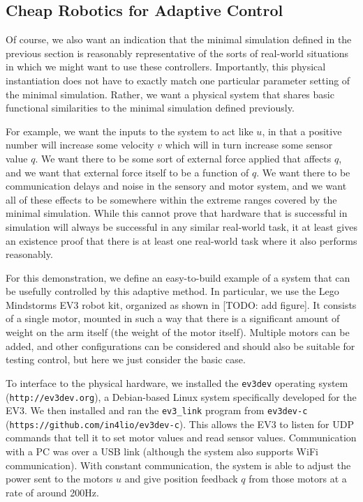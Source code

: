 \documentclass{frontiersSCNS} %
\begin{document}
\subsection{Cheap Robotics for Adaptive Control}

Of course, we also want an indication that the minimal simulation defined
in the previous section is reasonably representative of the sorts of real-world
situations in which we might want to use these controllers.  Importantly, 
this physical instantiation does not have to exactly match one particular
parameter setting of the minimal simulation.  Rather, we want a physical system
that shares basic functional similarities to the minimal simulation defined
previously.

For example, we want the inputs to the system to act like $u$, in that a
positive number will increase some velocity $v$ which will in turn increase some
sensor value $q$.  We want there to be some sort of external force applied that
affects $q$, and we want that external force itself to be a function of $q$.
We want there to be communication delays and noise in the sensory and motor
system, and we want all of these effects to be somewhere within the extreme
ranges covered by the minimal simulation.  While this cannot prove that hardware
that is successful in simulation will always be successful in any similar
real-world task, it at least gives an existence proof that there is at least
one real-world task where it also performs reasonably.

For this demonstration, we define an easy-to-build example of a system that can be usefully controlled
by this adaptive method.  In particular, we use the Lego Mindstorms EV3 robot kit,
organized as shown in [TODO: add figure].  It consists of a single
motor, mounted in such a way that there is a significant amount of weight on
the arm itself (the weight of the motor itself).  Multiple motors can be
added, and other configurations can be considered and should also be suitable
for testing control, but here we just consider the basic case.

To interface to the physical hardware, we installed the \texttt{ev3dev} operating
system (\texttt{http://ev3dev.org}), a Debian-based Linux system specifically developed
for the EV3.  We then installed and ran the \texttt{ev3\_link} program from \texttt{ev3dev-c}
(\texttt{https://github.com/in4lio/ev3dev-c}).  This allows the EV3 to listen for
UDP commands that tell it to set motor values and read sensor values.
Communication with a PC was over a USB link (although the system also
supports WiFi communication).  With constant communication, the system is
able to adjust the power sent to the motors $u$ and give position feedback
$q$ from those motors at a rate of around 200Hz.
\end{document}
